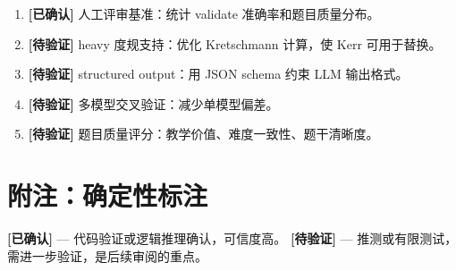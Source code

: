 \documentclass[12pt,a4paper]{article}
\newcommand{\certain}[1]{{\color{certcolor}\textbf{[已确认]}} #1}
\newcommand{\uncertain}[1]{{\color{uncertcolor}\textbf{[待验证]}} #1}
\begin{document}
\begin{enumerate}
    \item \certain{人工评审基准：统计 validate 准确率和题目质量分布。}
    \item \uncertain{heavy 度规支持：优化 Kretschmann 计算，使 Kerr 可用于替换。}
    \item \uncertain{structured output：用 JSON schema 约束 LLM 输出格式。}
    \item \uncertain{多模型交叉验证：减少单模型偏差。}
    \item \uncertain{题目质量评分：教学价值、难度一致性、题干清晰度。}
\end{enumerate}

\section*{附注：确定性标注}

{\color{certcolor}\textbf{[已确认]}} — 代码验证或逻辑推理确认，可信度高。
{\color{uncertcolor}\textbf{[待验证]}} — 推测或有限测试，需进一步验证，是后续审阅的重点。
\end{document}
